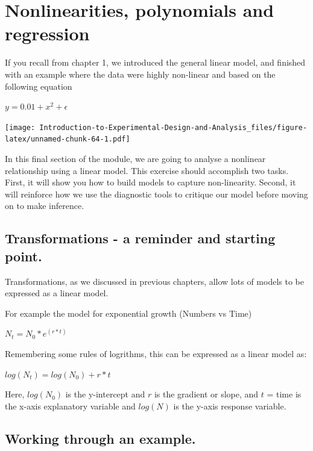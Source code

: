 \documentclass[
]{book}
\begin{document}
\hypertarget{nonlinearities-polynomials-and-regression}{%
\chapter{Nonlinearities, polynomials and regression}\label{nonlinearities-polynomials-and-regression}}

If you recall from chapter 1, we introduced the general linear model, and finished with an example where the data were highly non-linear and based on the following equation

\(y = 0.01 + x^{2} + \epsilon\)

\texttt{[image: Introduction-to-Experimental-Design-and-Analysis\_files/figure-latex/unnamed-chunk-64-1.pdf]}

In this final section of the module, we are going to analyse a nonlinear relationship using a linear model. This exercise should accomplish two tasks. First, it will show you how to build models to capture non-linearity. Second, it will reinforce how we use the diagnostic tools to critique our model before moving on to make inference.

\hypertarget{transformations---a-reminder-and-starting-point.}{%
\section{Transformations - a reminder and starting point.}\label{transformations---a-reminder-and-starting-point.}}

Transformations, as we discussed in previous chapters, allow lots of models to be expressed as a linear model.

For example the model for exponential growth (Numbers vs Time)

\(N_{t}=N_{0}*e^{(r*t)}\)

Remembering some rules of logrithms, this can be expressed as a linear model as:

\(log(N_{t})=log(N_{0}) + r*t\)

Here, \(log(N_{0})\) is the y-intercept and \(r\) is the gradient or slope, and \(t\) = time is the x-axis explanatory variable and \(log(N)\) is the y-axis response variable.

\hypertarget{working-through-an-example.}{%
\section{Working through an example.}\label{working-through-an-example.}}
\end{document}
